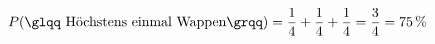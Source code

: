 \begin{exercise}
\begin{enumerate}[a)]
\begin{center}
            \end{center}
            \begin{equation*}
              P(\text{\glqq Höchstens einmal Wappen\grqq})=\frac{1}{4}+\frac{1}{4}+\frac{1}{4}=\frac{3}{4}=75\,\text{\%}
            \end{equation*}
    \end{enumerate}
  \fi
\end{exercise}
